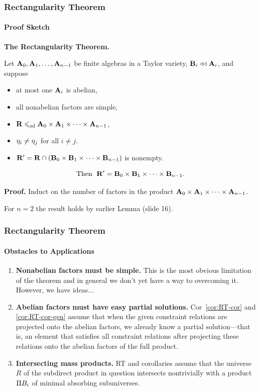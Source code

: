 \documentclass[xcolor=dvipsnames,9pt,hide notes,mathserif]{beamer}
\begin{document}
\begin{frame} \frametitle{Rectangularity Theorem}
  \framesubtitle{Proof Sketch}

    
  {\bf The Rectangularity Theorem.}

  \medskip
  Let $\mathbf{A}_0, \mathbf{A}_1, \dots, \mathbf{A}_{n-1}$ be finite algebras in a 
  Taylor variety, $\mathbf{B}_i \mathrel{\triangleleft\triangleleft} \mathbf{A}_i$, and suppose
  \begin{itemize}
  \item at most one $\mathbf{A}_i$ is abelian,
  \item all nonabelian factors are simple, 
  \item $\mathbf{R} \leqslant_{\mathrm{sd}} \mathbf{A}_0 \times \mathbf{A}_1 \times \cdots \times \mathbf{A}_{n-1}$,
  \item $\eta_i \neq \eta_j$ for all $i\neq j$. %
  \item $\mathbf{R}'= \mathbf{R} \cap (\mathbf{B}_0 \times \mathbf{B}_1 \times \cdots \times \mathbf{B}_{n-1})$ is nonempty.
  \end{itemize}
  
  \[\text{Then } \; \mathbf{R}' = \mathbf{B}_0 \times \mathbf{B}_1 \times \cdots \times \mathbf{B}_{n-1}.\] %

  {\bf Proof.} Induct on the number of factors in the product
  $\mathbf{A}_0 \times \mathbf{A}_1 \times \cdots \times \mathbf{A}_{n-1}$.

  \bigskip
  For $n=2$ the result holds by earlier Lemma (slide 16).

  \bigskip

\end{frame}
\begin{frame} \frametitle{Rectangularity Theorem}
  \framesubtitle{Obstacles to Applications}

  \begin{enumerate}
  \item<1-> {\bf Nonabelian factors must be simple.}
    This is the most obvious limitation of the theorem and in general
    we don't yet have a way to overcoming it.  However, we have ideas...

  \item<2-> {\bf Abelian factors must have easy partial solutions.}
    Cor~\ref{cor:RT-cor} and \ref{cor:RT-cor-gen} assume that
    when the given constraint relations are projected onto the abelian factors,
    we already know a partial solution---that is, an element that satisfies all
    constraint relations after projecting these relations onto the abelian
    factors of the full product. 

  \item<3-> {\bf Intersecting mass products.}
    RT and corollaries assume that the universe $R$ of the subdirect
    product in question intersects nontrivially
    with a product $\Pi B_i$ of minimal absorbing subuniverses.
  \end{enumerate}

\end{frame}
\end{document}
